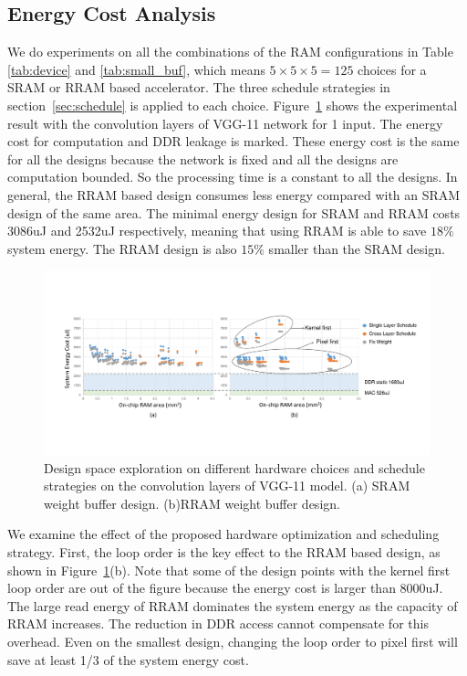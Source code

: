 \subsection{Energy Cost Analysis}
We do experiments on all the combinations of the RAM configurations in Table \ref{tab:device} and \ref{tab:small_buf}, which means $5\times 5\times 5 = 125$ choices for a SRAM or RRAM based accelerator. The three schedule strategies in section~\ref{sec:schedule} is applied to each choice. Figure~\ref{fig:design_space} shows the experimental result with the convolution layers of VGG-11 network for 1 input. The energy cost for computation and DDR leakage is marked. These energy cost is the same for all the designs because the network is fixed and all the designs are computation bounded. So the processing time is a constant to all the designs. In general, the RRAM based design consumes less energy compared with an SRAM design of the same area. The minimal energy design for SRAM and RRAM costs 3086uJ and 2532uJ respectively, meaning that using RRAM is able to save $18\%$ system energy. The RRAM design is also $15\%$ smaller than the SRAM design.

\begin{figure}[t]
  \centering
  \includegraphics[width=2\columnwidth]{fig/design_space.pdf}
  \vspace{-5pt}
  \caption{Design space exploration on different hardware choices and schedule strategies on the convolution layers of VGG-11 model. (a) SRAM weight buffer design. (b)RRAM weight buffer design.}
  \label{fig:design_space}
\end{figure}

We examine the effect of the proposed hardware optimization and scheduling strategy. First, the loop order is the key effect to the RRAM based design, as shown in Figure~\ref{fig:design_space}(b). Note that some of the design points with the kernel first loop order are out of the figure because the energy cost is larger than 8000uJ. The large read energy of RRAM dominates the system energy as the capacity of RRAM increases. The reduction in DDR access cannot compensate for this overhead. Even on the smallest design, changing the loop order to pixel first will save at least 1/3 of the system energy cost. 

